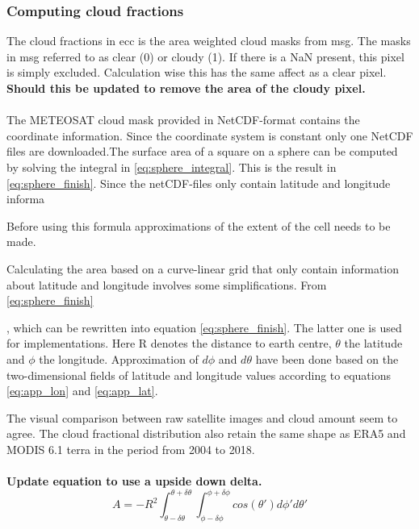 \subsubsection{Computing cloud fractions} \label{sec:remapping}
The cloud fractions in \acrshort{ecc} is the area weighted cloud masks from \acrshort{msg}. The masks in \acrshort{msg} referred to as clear (0) or cloudy (1).
If there is a NaN present, this pixel is simply excluded. Calculation wise this has the same affect as a clear pixel. \textbf{Should this be updated to remove the area of the cloudy pixel.} 
\\ \\
The METEOSAT cloud mask provided in NetCDF-format contains the coordinate information. Since the coordinate system is constant only one NetCDF files are downloaded.The surface area of a square on a sphere can be computed by solving the integral in \eqref{eq:sphere_integral}. This is the result in \eqref{eq:sphere_finish}. Since the netCDF-files only contain latitude and longitude informa

Before using this formula approximations of the extent of the cell needs to be made.
    
Calculating the area based on a curve-linear grid that only contain information about latitude and longitude involves some simplifications. From \eqref{eq:sphere_finish} 

, which can be rewritten into equation \eqref{eq:sphere_finish}. The latter one is used for implementations. Here R denotes the distance to earth centre, $\theta$ the latitude and $\phi$ the longitude. Approximation of $d\phi$ and $d\theta$ have been done based on the two-dimensional fields of latitude and longitude values according to equations \eqref{eq:app_lon} and  \eqref{eq:app_lat}.

The visual comparison between raw satellite images and cloud amount seem to agree. The cloud fractional distribution also retain the same shape as ERA5 and MODIS 6.1 terra in the period from 2004 to 2018. 
\\ \\
\textbf{Update equation to use a upside down delta.}
\begin{equation} \label{eq:sphere_integral}
    A = -R^2\int_{ \theta - \delta \theta }^{\theta + \delta \theta} \int_{ \phi - \delta \phi }^{\phi + \delta \phi} cos\left( \theta' \right) d\phi' d\theta'
\end{equation} 

